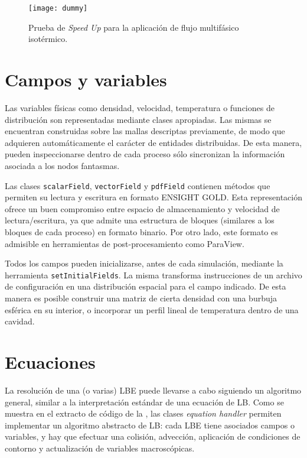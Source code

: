 \begin{figure}[ht]
	\centering
	\texttt{[image: dummy]}
	\caption{Prueba de \emph{Speed Up} para la aplicaci\'on de flujo multif\'asico isot\'ermico.}
	\label{fig:speedup_cpu}
\end{figure}




\section{Campos y variables}

Las variables f\'isicas como densidad, velocidad, temperatura o funciones de distribuci\'on son representadas mediante clases apropiadas. Las mismas se encuentran construidas sobre las mallas descriptas previamente, de modo que adquieren autom\'aticamente el car\'acter de entidades distribuidas. De esta manera, pueden inspeccionarse dentro de cada proceso s\'olo sincronizan la informaci\'on asociada a los nodos fantasmas.

Las clases \texttt{scalarField}, \texttt{vectorField} y \texttt{pdfField} contienen m\'etodos que permiten su lectura y escritura en formato ENSIGHT GOLD. Esta representaci\'on ofrece un buen compromiso entre espacio de almacenamiento y velocidad de lectura/escritura, ya que admite una estructura de bloques (similares a los bloques de cada proceso) en formato binario. Por otro lado, este formato es admisible en herramientas de post-procesamiento como ParaView.

Todos los campos pueden inicializarse, antes de cada simulaci\'on, mediante la herramienta \texttt{setInitialFields}. La misma transforma instrucciones de un archivo de configuraci\'on en una distribuci\'on espacial para el campo indicado. De esta manera es posible construir una matriz de cierta densidad con una burbuja esf\'erica en su interior, o incorporar un perfil lineal de temperatura dentro de una cavidad.



\section{Ecuaciones}

La resoluci\'on de una (o varias) LBE puede llevarse a cabo siguiendo un algoritmo general, similar a la interpretaci\'on est\'andar de una ecuaci\'on de LB. Como se muestra en el extracto de c\'odigo de la , las clases \emph{equation handler} permiten implementar un algoritmo abstracto de LB: cada LBE tiene asociados campos o variables, y hay que efectuar una colisi\'on, advecci\'on, aplicaci\'on de condiciones de contorno y actualizaci\'on de variables macrosc\'opicas.

